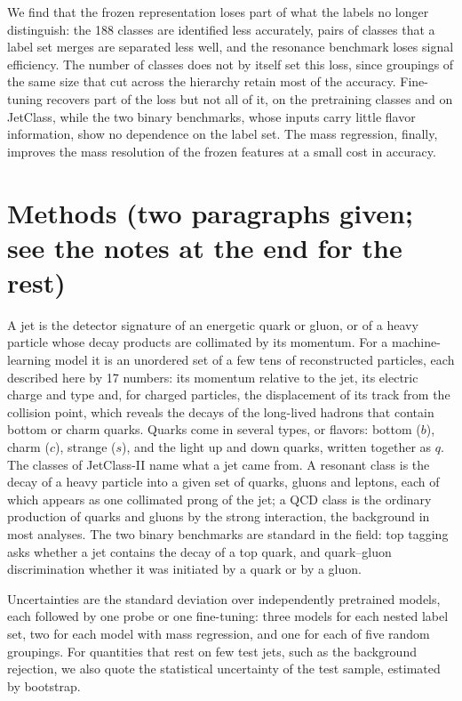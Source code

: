 \documentclass[11pt,a4paper]{article}
\begin{document}
We find that the frozen representation loses part of what the labels no longer distinguish: the
188 classes are identified less accurately, pairs of classes that a label set merges are separated
less well, and the resonance benchmark loses signal efficiency.
The number of classes does not by itself set this loss, since groupings of the same size that cut
across the hierarchy retain most of the accuracy.
Fine-tuning recovers part of the loss but not all of it, on the pretraining classes and on
JetClass, while the two binary benchmarks, whose inputs carry little flavor information, show no
dependence on the label set.
The mass regression, finally, improves the mass resolution of the frozen features at a small cost
in accuracy.

\section{Methods (two paragraphs given; see the notes at the end for the rest)}
A jet is the detector signature of an energetic quark or gluon, or of a heavy particle whose decay
products are collimated by its momentum.
For a machine-learning model it is an unordered set of a few tens of reconstructed particles, each
described here by 17 numbers: its momentum relative to the jet, its electric charge and type and,
for charged particles, the displacement of its track from the collision point, which reveals the
decays of the long-lived hadrons that contain bottom or charm quarks.
Quarks come in several types, or flavors: bottom ($b$), charm ($c$), strange ($s$), and the light
up and down quarks, written together as $q$.
The classes of JetClass-II name what a jet came from.
A resonant class is the decay of a heavy particle into a given set of quarks, gluons and leptons,
each of which appears as one collimated prong of the jet; a QCD class is the ordinary production
of quarks and gluons by the strong interaction, the background in most analyses.
The two binary benchmarks are standard in the field: top tagging asks whether a jet contains the
decay of a top quark, and quark--gluon discrimination whether it was initiated by a quark or by a
gluon.

Uncertainties are the standard deviation over independently pretrained models, each followed by
one probe or one fine-tuning: three models for each nested label set, two for each model with
mass regression, and one for each of five random groupings.
For quantities that rest on few test jets, such as the background rejection, we also quote the
statistical uncertainty of the test sample, estimated by bootstrap.
\end{document}
